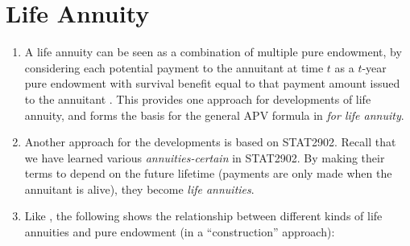 \section{Life Annuity}
\label{sect:life-annuity}
\begin{enumerate}
\item A life annuity can be seen as a combination of multiple pure endowment,
by considering each potential payment to the annuitant  at time
\(t\) as a \(t\)-year pure endowment with survival benefit equal to that
payment amount issued to the annuitant . This provides one
approach for developments of life annuity, and forms the basis for the
general APV formula in  \emph{for life annuity}.


\item Another approach for the developments is based on STAT2902.
Recall that we have learned various \emph{annuities-certain} in STAT2902. By
making their terms to depend on the future lifetime (payments
 are only made when the annuitant  is
alive), they become \emph{life annuities}.

\item Like , the following shows the
relationship between different kinds of life annuities and pure endowment (in a
``construction'' approach):


\end{enumerate}
